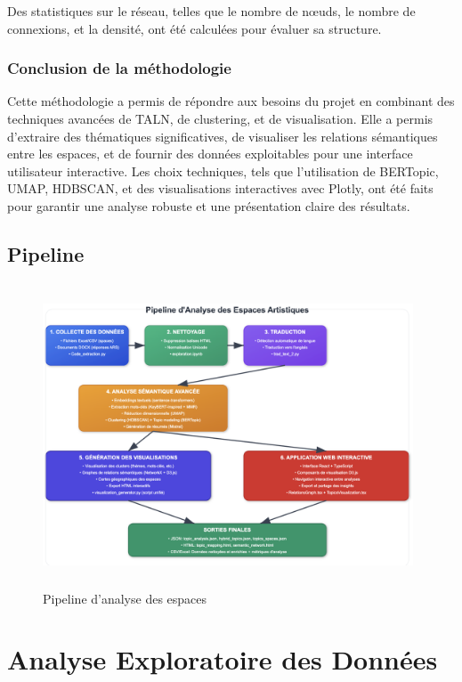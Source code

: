 \documentclass[mstat,12pt]{unswthesis}
\begin{document}
Des statistiques sur le réseau, telles que le nombre de nœuds, le nombre de connexions, et la densité, ont été calculées pour évaluer sa structure.

\subsection{Conclusion de la méthodologie}

Cette méthodologie a permis de répondre aux besoins du projet en combinant des techniques avancées de TALN, de clustering, et de visualisation. Elle a permis d'extraire des thématiques significatives, de visualiser les relations sémantiques entre les espaces, et de fournir des données exploitables pour une interface utilisateur interactive. Les choix techniques, tels que l'utilisation de BERTopic, UMAP, HDBSCAN, et des visualisations interactives avec Plotly, ont été faits pour garantir une analyse robuste et une présentation claire des résultats.

\hypertarget{Pipeline}{%
\section{Pipeline}\label{Pipeline}}

\begin{figure}[H]
    \centering
    \includegraphics[width=11cm,height=9cm]{Pipeline_diagram.png}
    \caption{Pipeline d'analyse des espaces}
    \label{fig:enquete}
\end{figure}

\hypertarget{analyse-exploratoire-des-donnuxe9es}{%
\chapter{Analyse Exploratoire des Données}\label{analyse-exploratoire-des-donnuxe9es}}
\end{document}
